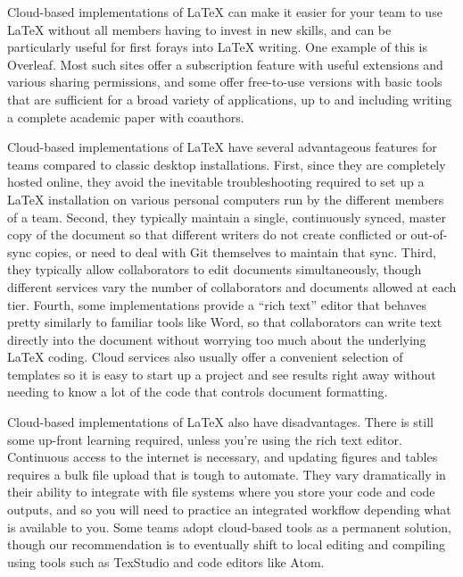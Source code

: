 Cloud-based implementations of {\LaTeX} can make it easier for your team to use
{\LaTeX} without all members having to invest in new skills,
and can be particularly useful for first forays into {\LaTeX} writing.
One example of this is Overleaf.
Most such sites offer a subscription feature
with useful extensions and various sharing permissions,
and some offer free-to-use versions with basic tools that are sufficient
for a broad variety of applications,
up to and including writing a complete academic paper with coauthors.

Cloud-based implementations of {\LaTeX} have several advantageous features
for teams compared to classic desktop installations.
First, since they are completely hosted online,
they avoid the inevitable troubleshooting required to set up a {\LaTeX} installation
on various personal computers run by the different members of a team.
Second, they typically maintain a single, continuously synced, master copy of the document
so that different writers do not create conflicted or out-of-sync copies,
or need to deal with Git themselves to maintain that sync.
Third, they typically allow collaborators to edit documents simultaneously,
though different services vary the number of collaborators and documents allowed at each tier.
Fourth, some implementations provide a ``rich text'' editor
that behaves pretty similarly to familiar tools like Word,
so that collaborators can write text directly into the document without worrying too much
about the underlying {\LaTeX} coding.
Cloud services also usually offer a convenient selection of templates
so it is easy to start up a project and see results right away
without needing to know a lot of the code that controls document formatting.

Cloud-based implementations of {\LaTeX} also have disadvantages.
There is still some up-front learning required, unless you're using the rich text editor.
Continuous access to the internet is necessary,
and updating figures and tables requires a bulk file upload that is tough to automate.
They vary dramatically in their ability to integrate
with file systems where you store your code and code outputs,
and so you will need to practice an integrated workflow depending what is available to you.
Some teams adopt cloud-based tools as a permanent solution,
though our recommendation is to eventually shift to
local editing and compiling using tools such as TexStudio and code editors like Atom.

